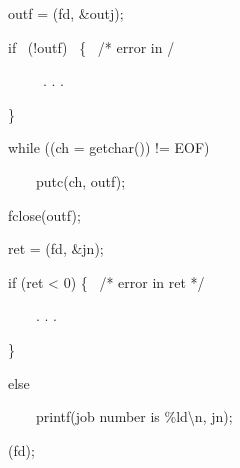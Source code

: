 \begin{expara}
\bigskip


outf = \funcnameXBjobadd{}(fd, \&outj);

if \ (!outf) \ \{ \ /* error in \errorloc */

\ \ \ \ \ . . .

\}

\bigskip


while ((ch = getchar()) != EOF)

\ \ \ \ putc(ch, outf);

fclose(outf);

ret = \funcnameXBjobres{}(fd, \&jn);

if (ret {\textless} 0) \{ \ /* error in ret */

\ \ \ \ . . .

\}

else

\ \ \ \ printf({\textquotedbl}job number is
\%ld{\textbackslash}n{\textquotedbl}, jn);

\bigskip


\funcnameXBclose{}(fd);

\end{expara}

